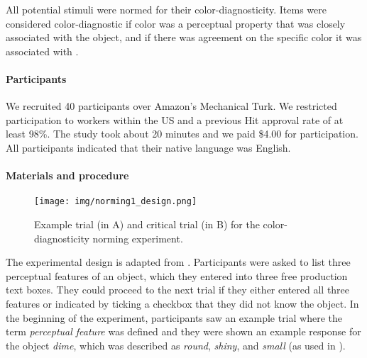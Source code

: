 \documentclass[a4paper,man,floatsintext,natbib,donotrepeattitle]{apa6}
\begin{document}


All potential stimuli were normed for their color-diagnosticity. Items were considered color-diagnostic if color was a perceptual property that was closely associated with the object, and if there was agreement on the specific color it was associated with \citep{Tanaka:1999}.

\paragraph{Participants}
We recruited 40 participants over Amazon's Mechanical Turk. We restricted participation to workers within the US and a previous Hit approval rate of at least 98\%. The study took about 20 minutes and we paid \$4.00 for participation. All participants indicated that their native language was English.

\paragraph{Materials and procedure}

\begin{figure}
	\texttt{[image: img/norming1\_design.png]}
	\caption{Example trial (in A) and critical trial (in B) for the color-diagnosticity norming experiment.}
	\label{fig:norming1design}
\end{figure}

The experimental design is adapted from \cite{Tanaka:1999}. 
Participants were asked to list three perceptual features of an object, which they entered into three free production text boxes. They could proceed to the next trial if they either entered all three features or indicated by ticking a checkbox that they did not know the object. In the beginning of the experiment, participants saw an example trial where the term \textit{perceptual feature} was defined and they were shown an example response for the object \textit{dime}, which was described as \textit{round}, \textit{shiny}, and \textit{small} (as used in \cite{Tanaka:1999}).
\end{document}

